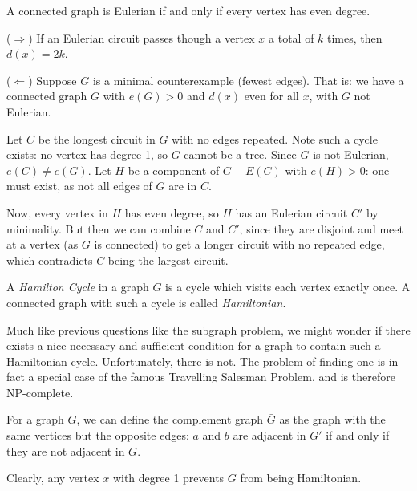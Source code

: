 \documentclass{article}
\begin{document}
\begin{theorem}
    A connected graph is Eulerian if and only if every vertex has even degree.
\end{theorem}

\begin{prf}
    ($\Rightarrow$) If an Eulerian circuit passes though a vertex $x$ a total of $k$ times, then $d(x) = 2k$.
    
    ($\Leftarrow$) Suppose $G$ is a minimal counterexample (fewest edges). That is: we have a connected graph $G$ with $e(G) > 0$ and $d(x)$ even for all $x$, with $G$ not Eulerian.
    
    Let $C$ be the longest circuit in $G$ with no edges repeated. Note such a cycle exists: no vertex has degree 1, so $G$ cannot be a tree. Since $G$ is not Eulerian, $e(C) \neq e(G)$. Let $H$ be a component of $G - E(C)$ with $e(H) > 0$: one must exist, as not all edges of $G$ are in $C$.
    
    Now, every vertex in $H$ has even degree, so $H$ has an Eulerian circuit $C'$ by minimality. But then we can combine $C$ and $C'$, since they are disjoint and meet at a vertex (as $G$ is connected) to get a longer circuit with no repeated edge, which contradicts $C$ being the largest circuit.
\end{prf}

\begin{definition}
    A \textit{Hamilton Cycle} in a graph $G$ is a cycle which visits each vertex exactly once. A connected graph with such a cycle is called \textit{Hamiltonian}.
\end{definition}

Much like previous questions like the subgraph problem, we might wonder if there exists a nice necessary and sufficient condition for a graph to contain such a Hamiltonian cycle. Unfortunately, there is not. The problem of finding one is in fact a special case of the famous Travelling Salesman Problem, and is therefore NP-complete.

\begin{definition}[Complement]
    For a graph $G$, we can define the complement graph $\bar{G}$ as the graph with the same vertices but the opposite edges: $a$ and $b$ are adjacent in $G'$ if and only if they are not adjacent in $G$.
\end{definition}

\begin{note}
	Clearly, any vertex $x$ with degree 1 prevents $G$ from being Hamiltonian.
\end{note}
\end{document}
